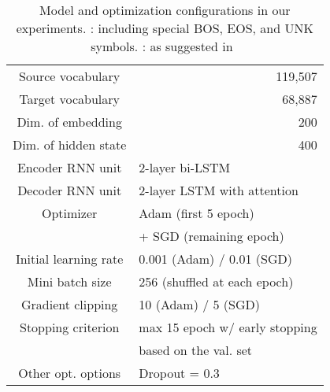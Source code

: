 \documentclass[11pt]{article}
\begin{document}
\begin{table}[t]
 \centering
 \small
 \tabcolsep=4pt
 \begin{tabular}{ c | r || c | r}
\hline 
  Source vocabulary         & \multicolumn{3}{r}{ 119,507} \\
  Target vocabulary         & \multicolumn{3}{r}{  68,887} \\
  Dim. of embedding      & \multicolumn{3}{r}{200}   \\
  Dim. of hidden state   & \multicolumn{3}{r}{400}   \\
  \hline 
  Encoder RNN unit           & \multicolumn{3}{l}{2-layer bi-LSTM} \\
  Decoder RNN unit           & \multicolumn{3}{l}{2-layer LSTM with attention}   \\
   \hline
Optimizer                  & \multicolumn{3}{l}{Adam (first 5 epoch)}\\
  \                          & \multicolumn{3}{l}{+ SGD (remaining epoch)  }\\
  Initial learning rate      & \multicolumn{3}{l}{0.001 (Adam) / 0.01 (SGD) } \\
  Mini batch size            & \multicolumn{3}{l}{256 (shuffled at each epoch) } \\
  Gradient clipping          & \multicolumn{3}{l}{10 (Adam) / 5 (SGD)}  \\
  Stopping criterion         & \multicolumn{3}{l}{max 15 epoch w/ early stopping}  \\
  \                          & \multicolumn{3}{l}{based on the val. set}  \\
  Other opt. options         & \multicolumn{3}{l}{Dropout = 0.3}               \\
    \hline
 \end{tabular}
 \caption{Model and optimization configurations in our experiments. : including special BOS, EOS, and UNK symbols. : as suggested in~\cite{DBLP:journals/corr/WuSCLNMKCGMKSJL16} }
  \label{table:configuration}
\end{table}
\end{document}
